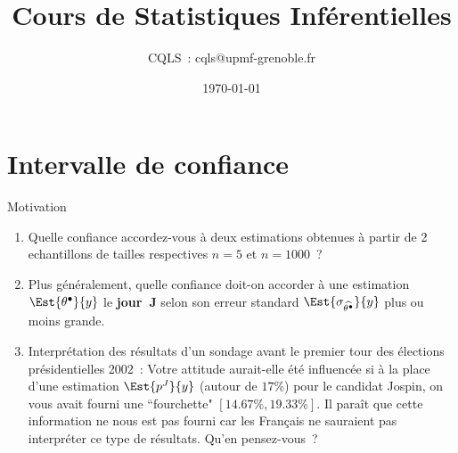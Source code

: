 \documentclass[11pt]{beamer}
\title[Problématiques Produits A et B]
{Cours de Statistiques Inférentielles}
\author{CQLS~: cqls@upmf-grenoble.fr}
\date{\today}
\begin{document}
\maketitle



\section[I. C.]{Intervalle de confiance}

\begin{frame}{}
\begin{alertblock}{Motivation}
\pause
\begin{enumerate}[<+->]
\item Quelle confiance accordez-vous à deux estimations obtenues à partir de 2 echantillons de tailles respectives $n=5$ et $n=1000$~?
\item Plus généralement, quelle confiance doit-on accorder à une estimation $\Est{\theta^\bullet}{y}$ le \textbf{jour~J} selon son erreur standard $\Est{\sigma_{\widehat{\theta^\bullet}}}{y}$ plus ou moins grande. 
\item Interprétation des résultats d'un sondage avant le premier tour des élections présidentielles 2002~: Votre attitude aurait-elle été influencée si à la place d'une estimation $\Est{p^J}{y}$ (autour de $17\%$) pour le candidat Jospin, on vous avait fourni une ``fourchette" $[14.67\%,19.33\%]$.
Il paraît que cette information ne nous est pas fourni car les Français ne sauraient pas interpréter ce type de résultats. Qu'en pensez-vous~?    
\end{enumerate}
\end{alertblock}
\end{frame}

\end{document}
